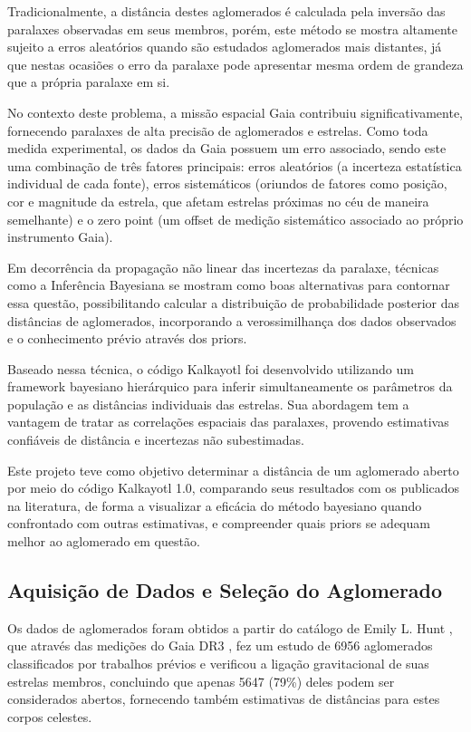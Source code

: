 \documentclass[12pt]{projeto}
\begin{document}
Tradicionalmente, a distância destes aglomerados é calculada pela inversão das paralaxes observadas em seus membros, porém, este método se mostra altamente sujeito a erros aleatórios quando são estudados aglomerados mais distantes, já que nestas ocasiões o erro da paralaxe pode apresentar mesma ordem de grandeza que a própria paralaxe em si.

No contexto deste problema, a missão espacial Gaia \cite{gaia_collaboration_gaia_2016} contribuiu significativamente, fornecendo paralaxes de alta precisão de aglomerados e estrelas. Como toda medida experimental, os dados da Gaia possuem um erro associado, sendo este uma combinação de três fatores principais: erros aleatórios (a incerteza estatística individual de cada fonte), erros sistemáticos (oriundos de fatores como posição, cor e magnitude da estrela, que afetam estrelas próximas no céu de maneira semelhante) e o zero point (um offset de medição sistemático associado ao próprio instrumento Gaia).

Em decorrência da propagação não linear das incertezas da paralaxe, técnicas como a Inferência Bayesiana se mostram como boas alternativas para contornar essa questão, possibilitando calcular a distribuição de probabilidade posterior das distâncias de aglomerados, incorporando a verossimilhança dos dados observados e o conhecimento prévio através dos priors.

Baseado nessa técnica, o código Kalkayotl \cite{olivares_kalkayotl_2020} foi desenvolvido utilizando um framework bayesiano hierárquico para inferir simultaneamente os parâmetros da população e as distâncias individuais das estrelas. Sua abordagem tem a vantagem de tratar as correlações espaciais das paralaxes, provendo estimativas confiáveis de distância e incertezas não subestimadas. 

Este projeto teve como objetivo determinar a distância de um aglomerado aberto por meio do código Kalkayotl 1.0, comparando seus resultados com os publicados na literatura, de forma a visualizar a eficácia do método bayesiano quando confrontado com outras estimativas, e compreender quais priors se adequam melhor ao aglomerado em questão. 

\subsection{Aquisição de Dados e Seleção do Aglomerado}

Os dados de aglomerados foram obtidos a partir do catálogo de Emily L. Hunt \cite{hunt_improving_2024}, que através das medições do Gaia DR3 \cite{vallenari_gaia_2023}, fez um estudo de 6956 aglomerados classificados por trabalhos prévios e verificou a ligação gravitacional de suas estrelas membros, concluindo que apenas 5647 (79\%) deles podem ser considerados abertos, fornecendo também estimativas de distâncias para estes corpos celestes. 
\end{document}
